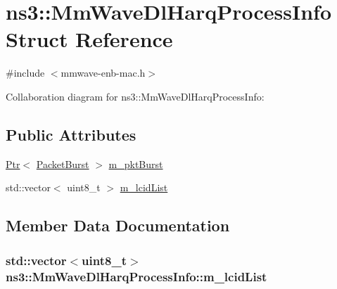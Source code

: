 \hypertarget{structns3_1_1MmWaveDlHarqProcessInfo}{}\section{ns3\+:\+:Mm\+Wave\+Dl\+Harq\+Process\+Info Struct Reference}
\label{structns3_1_1MmWaveDlHarqProcessInfo}


{\ttfamily \#include $<$mmwave-\/enb-\/mac.\+h$>$}



Collaboration diagram for ns3\+:\+:Mm\+Wave\+Dl\+Harq\+Process\+Info\+:
\subsection*{Public Attributes}
\begin{DoxyCompactItemize}
\item 
\hyperlink{classns3_1_1Ptr}{Ptr}$<$ \hyperlink{classns3_1_1PacketBurst}{Packet\+Burst} $>$ \hyperlink{structns3_1_1MmWaveDlHarqProcessInfo_ad07c640ba798a8f9354fb678211624ab}{m\+\_\+pkt\+Burst}
\item 
std\+::vector$<$ uint8\+\_\+t $>$ \hyperlink{structns3_1_1MmWaveDlHarqProcessInfo_a360ab2c59d16c37318a1ab392570e312}{m\+\_\+lcid\+List}
\end{DoxyCompactItemize}


\subsection{Member Data Documentation}
\subsubsection[{\texorpdfstring{m\+\_\+lcid\+List}{m_lcidList}}]{\setlength{\rightskip}{0pt plus 5cm}std\+::vector$<$uint8\+\_\+t$>$ ns3\+::\+Mm\+Wave\+Dl\+Harq\+Process\+Info\+::m\+\_\+lcid\+List}\hypertarget{structns3_1_1MmWaveDlHarqProcessInfo_a360ab2c59d16c37318a1ab392570e312}{}\label{structns3_1_1MmWaveDlHarqProcessInfo_a360ab2c59d16c37318a1ab392570e312}
